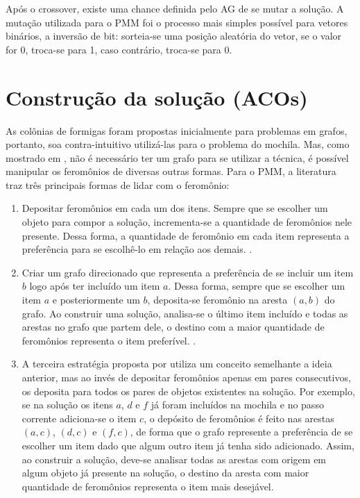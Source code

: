 Após o crossover, existe uma chance definida pelo AG de se mutar a solução. A mutação utilizada para o PMM foi o processo mais simples possível para vetores binários, a inversão de bit: sorteia-se uma posição aleatória do vetor, se o valor for 0, troca-se para 1, caso contrário, troca-se para 0.

\section{Construção da solução (ACOs)}
\label{section_estrategias_pmm_aco}
As colônias de formigas foram propostas inicialmente para problemas em grafos, portanto, soa contra-intuitivo utilizá-las para o problema do mochila. Mas, como mostrado em \cite{Ke2010}, não é necessário ter um grafo para se utilizar a técnica, é possível manipular os feromônios de diversas outras formas. Para o PMM, a literatura traz três principais formas de lidar com o feromônio:

\begin{enumerate} 
	\item Depositar feromônios em cada um dos itens. Sempre que se escolher um objeto para compor a solução, incrementa-se a quantidade de feromônios nele presente. Dessa forma, a quantidade de feromônio em cada item representa a preferência para se escolhê-lo em relação aos demais. \cite{Leguizamon1999}.
	\item Criar um grafo direcionado que representa a preferência de se incluir um item $b$ logo após ter incluído um item $a$. Dessa forma, sempre que se escolher um item $a$ e posteriormente um $b$, deposita-se feromônio na aresta $(a,b)$ do grafo. Ao construir uma solução, analisa-se o último item incluído e todas as arestas no grafo que partem dele, o destino com a maior quantidade de feromônios representa o item preferível. \cite{Fidanova2003}.
	\item A terceira estratégia proposta por \cite{Alaya2004} utiliza um conceito semelhante a ideia anterior, mas ao invés de depositar feromônios apenas em pares consecutivos, os deposita para todos os pares de objetos existentes na solução. Por exemplo, se na solução os itens $a$, $d$ e $f$ já foram incluídos na mochila e no passo corrente adiciona-se o item $c$, o depósito de feromônios é feito nas arestas $(a,c)$, $(d,c)$ e $(f,c)$, de forma que o grafo represente a preferência de se escolher um item dado que algum outro item já tenha sido adicionado. Assim, ao construir a solução, deve-se analisar todas as arestas com origem em algum objeto já presente na solução, o destino da aresta com maior quantidade de feromônios representa o item mais desejável.
\end{enumerate}

